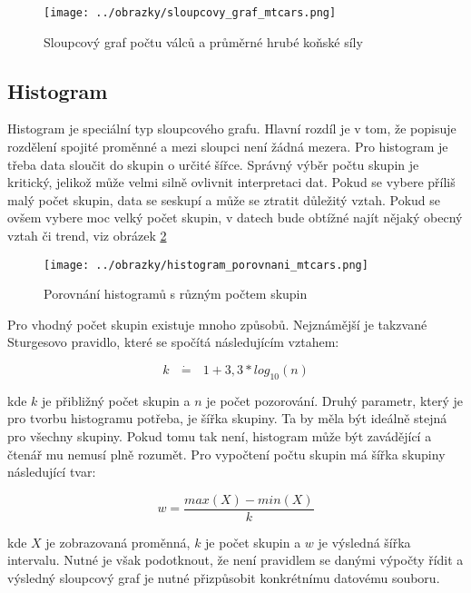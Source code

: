 \begin{figure}[H]
    \centering
    \texttt{[image: ../obrazky/sloupcovy\_graf\_mtcars.png]}
    \caption{Sloupcový graf počtu válců a průměrné hrubé koňské síly} 
    \label{fig:sloupcovy_graf_mtcars}
\end{figure}

\subsection{Histogram}

Histogram je speciální typ sloupcového grafu. Hlavní rozdíl je v tom, že popisuje rozdělení spojité proměnné a mezi sloupci není žádná mezera.
Pro histogram je třeba data sloučit do skupin o určité šířce. Správný výběr počtu skupin je kritický, jelikož může velmi
silně ovlivnit interpretaci dat. Pokud se vybere příliš malý počet skupin, data se seskupí a může se ztratit důležitý vztah. Pokud se ovšem
vybere moc velký počet skupin, v datech bude obtížné najít nějaký obecný vztah či trend,
{\color{red}
viz obrázek \ref{fig:histogram_porovnani_mtcars}
}
\begin{figure}[H]
    \centering
    \texttt{[image: ../obrazky/histogram\_porovnani\_mtcars.png]}
    \caption{Porovnání histogramů s různým počtem skupin} 
    \label{fig:histogram_porovnani_mtcars}
\end{figure}

Pro vhodný počet skupin existuje mnoho způsobů. Nejznámější je takzvané Sturgesovo pravidlo, které se spočítá následujícím vztahem:

\begin{equation}
    \label{eq:sturgesovo_pravidlo}
    k \text{ } \dot{\mathbf{=}} \text{ } 1 + 3,3 * log_{10}(n)
\end{equation}

kde $k$ je přibližný počet skupin a $n$ je počet pozorování. Druhý parametr, který je pro tvorbu histogramu potřeba, je šířka skupiny.
Ta by měla být ideálně stejná pro všechny skupiny. Pokud tomu tak není, histogram může být zavádějící a čtenář mu nemusí plně rozumět.
Pro vypočtení počtu skupin má šířka skupiny následující tvar:

\begin{equation}
    \label{eq:sirka_histogramu}
    w = \frac{max(X) - min(X)}{k}
\end{equation}

kde $X$ je zobrazovaná proměnná, $k$ je počet skupin a $w$ je výsledná šířka intervalu. 
Nutné je však podotknout, že není pravidlem se danými výpočty řídit a výsledný
sloupcový graf je nutné přizpůsobit
{\color{red}
konkrétnímu datovému souboru.
}


